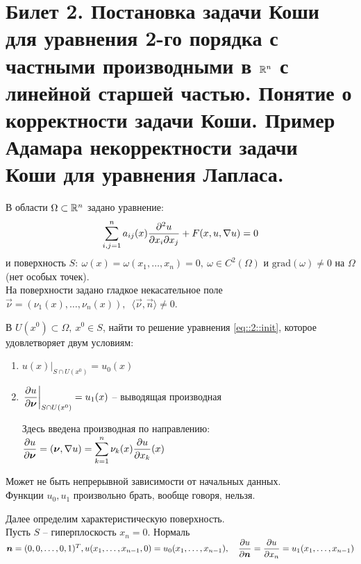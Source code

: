 \documentclass[../main.tex]{subfiles}
\begin{document}
\section{Билет 2. Постановка задачи Коши для уравнения 2-го порядка с частными производными в \texorpdfstring{$\mathbb{R}^n$}{R\textasciicircum n} с линейной старшей частью. Понятие о корректности задачи Коши. Пример Адамара некорректности задачи Коши для уравнения Лапласа.}
В области $\Omega \subset \mathbb{R}^n$ задано уравнение:
\begin{equation}
\label{eq::2::init}
\sum\limits_{i,j=1}^{n} a_{ij}(x)\frac{\partial^2u}{\partial x_i\partial x_j} + F(x, u, \nabla u) = 0
\end{equation}
и поверхность $S:\ \omega(x) = \omega(x_1, \dots, x_n) = 0,\ \omega \in C^2(\Omega)$ и $\mathrm{grad}(\omega) \not= 0$ на $\Omega$ (нет особых точек).\\
На поверхности задано гладкое некасательное поле $\vec{\nu} = (\nu_1(x), \dots, \nu_n(x)),\ \; \langle \vec{\nu}, \vec{n} \rangle \not= 0$.
\begin{definition}
В $U(x^0)\subset\Omega,\ x^0 \in S$, найти то решение уравнения \eqref{eq::2::init}, которое удовлетворяет двум условиям:
\begin{enumerate}
\item $u(x)|_{S\cap U(x^0)}=u_0(x)$
\item $\left.\dfrac{\partial u}{\partial \boldsymbol{\nu}}\right|_{S\cap U(x^0)} = u_1(x)$ -- выводящая производная

Здесь введена производная по направлению: $\dfrac{\partial u}{\partial \boldsymbol{\nu}} = \left(\boldsymbol{\nu}, \nabla u\right) = \displaystyle\sum\limits_{k=1}^{n} \nu_k(x)\dfrac{\partial u}{\partial x_k}(x) $
\end{enumerate}
\end{definition}
Может не быть непрерывной зависимости от начальных данных.\\
Функции $u_0, u_1$ произвольно брать, вообще говоря, нельзя.


Далее определим характеристическую поверхность.\\
Пусть $S$ -- гиперплоскость $x_n = 0$. Нормаль $\boldsymbol{n} = (0,0,\dots,0, 1)^T,\\
u(x_1, \dots, x_{n-1}, 0) = u_0(x_1, \dots, x_{n-1}),\quad \dfrac{\partial u}{\partial\boldsymbol{n}} = \dfrac{\partial u}{\partial x_n} = u_1(x_1, \dots, x_{n-1}) $
\end{document}

